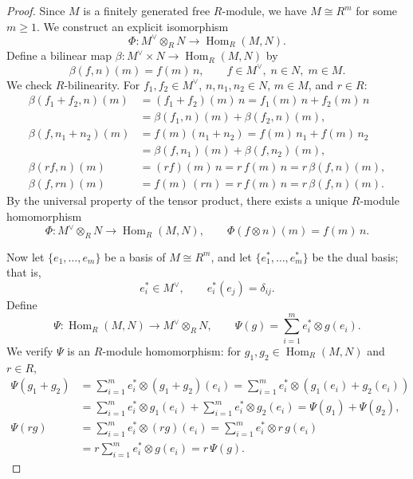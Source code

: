 \begin{proof}
    Since $M$ is a finitely generated free $R$-module, we have $M \cong R^m$ for some $m \geq 1$. We construct an explicit isomorphism
    \[
        \Phi: M^{\vee} \otimes_R N \to \operatorname{Hom}_R(M, N).
    \]
    Define a bilinear map $\beta: M^{\vee} \times N \to \operatorname{Hom}_R(M,N)$ by
    \[
        \beta(f, n)(m) = f(m)\, n, \qquad f \in M^{\vee},\; n \in N,\; m \in M.
    \]
    We check $R$-bilinearity. For $f_1, f_2 \in M^{\vee}$, $n, n_1, n_2 \in N$, $m \in M$, and $r \in R$:
    \begin{align*}
        \beta(f_1+f_2, n)(m) & = (f_1+f_2)(m)\,n = f_1(m)\,n + f_2(m)\,n     \\
                             & = \beta(f_1,n)(m)+\beta(f_2,n)(m),            \\
        \beta(f, n_1+n_2)(m) & = f(m)(n_1+n_2) = f(m)\,n_1+f(m)\,n_2         \\
                             & = \beta(f,n_1)(m)+\beta(f,n_2)(m),            \\
        \beta(rf, n)(m)      & = (rf)(m)\,n = r\,f(m)\,n = r\,\beta(f,n)(m), \\
        \beta(f, rn)(m)      & = f(m)\,(rn) = r\,f(m)\,n = r\,\beta(f,n)(m).
    \end{align*}
    By the universal property of the tensor product, there exists a unique $R$-module homomorphism
    \[
        \Phi: M^{\vee} \otimes_R N \to \operatorname{Hom}_R(M, N), \qquad \Phi(f \otimes n)(m) = f(m)\,n.
    \]

    Now let $\{e_1, \ldots, e_m\}$ be a basis of $M \cong R^m$, and let $\{e_1^*, \ldots, e_m^*\}$ be the dual basis; that is,
    \[
        e_i^* \in M^{\vee},
        \qquad
        e_i^*(e_j) = \delta_{ij}.
    \]
    Define
    \[
        \Psi: \operatorname{Hom}_R(M, N) \to M^{\vee} \otimes_R N, \qquad \Psi(g) = \sum_{i=1}^{m} e_i^* \otimes g(e_i).
    \]
    We verify $\Psi$ is an $R$-module homomorphism: for $g_1, g_2 \in \operatorname{Hom}_R(M,N)$ and $r \in R$,
    \begin{align*}
        \Psi(g_1+g_2) & = \sum_{i=1}^m e_i^* \otimes (g_1+g_2)(e_i) = \sum_{i=1}^m e_i^* \otimes (g_1(e_i)+g_2(e_i))       \\
                      & = \sum_{i=1}^m e_i^* \otimes g_1(e_i) + \sum_{i=1}^m e_i^* \otimes g_2(e_i) = \Psi(g_1)+\Psi(g_2), \\
        \Psi(rg)      & = \sum_{i=1}^m e_i^* \otimes (rg)(e_i) = \sum_{i=1}^m e_i^* \otimes r\,g(e_i)                      \\
                      & = r \sum_{i=1}^m e_i^* \otimes g(e_i) = r\,\Psi(g).
    \end{align*}


\end{proof}
